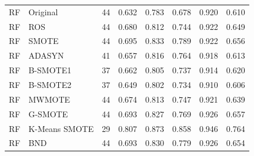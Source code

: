 \begin{longtable}{@{}llrrrrrr@{}}
RF & Original & 44 & 0.632 & 0.783 & 0.678 & 0.920 & 0.610 \\
RF & ROS & 44 & 0.680 & 0.812 & 0.744 & 0.922 & 0.649 \\
RF & SMOTE & 44 & 0.695 & 0.833 & 0.789 & 0.922 & 0.656 \\
RF & ADASYN & 41 & 0.657 & 0.816 & 0.764 & 0.918 & 0.613 \\
RF & B-SMOTE1 & 37 & 0.662 & 0.805 & 0.737 & 0.914 & 0.620 \\
RF & B-SMOTE2 & 37 & 0.649 & 0.802 & 0.734 & 0.910 & 0.606 \\
RF & MWMOTE & 44 & 0.674 & 0.813 & 0.747 & 0.921 & 0.639 \\
RF & G-SMOTE & 44 & 0.693 & 0.827 & 0.769 & 0.926 & 0.657 \\
RF & K-Means SMOTE & 29 & 0.807 & 0.873 & 0.858 & 0.946 & 0.764 \\
RF & BND & 44 & 0.693 & 0.830 & 0.779 & 0.926 & 0.654 \\
\end{longtable}
\endgroup
